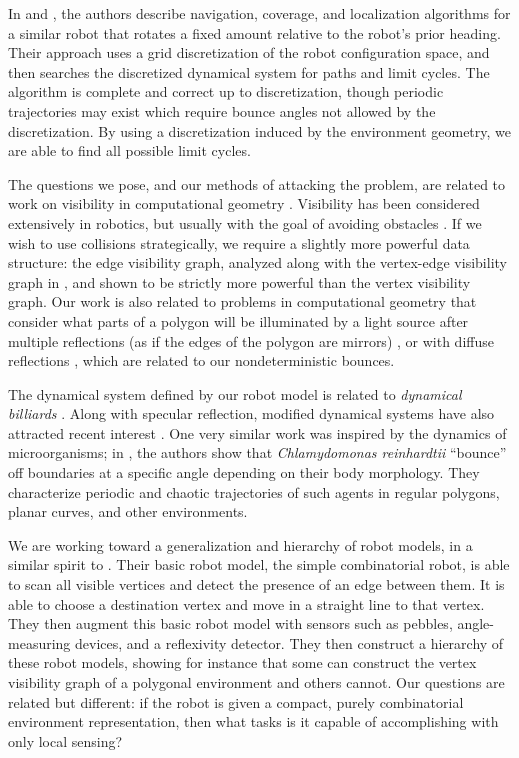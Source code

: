 \documentclass[]{styles/svproc}  %
\begin{document}
In \cite{alam2017minimalist} and \cite{alam2018space}, the authors describe
navigation, coverage, and localization algorithms for a similar robot that rotates a fixed amount 
relative to the robot's prior heading. 
Their approach uses a grid discretization of the robot configuration space, and 
then searches the discretized dynamical system for paths and limit cycles. The
algorithm is complete and correct up to discretization, though periodic
trajectories may exist which require bounce angles not allowed by the
discretization. By using a discretization induced by the environment geometry,
we are able to find all possible limit cycles.



The questions we pose, and our methods of attacking the problem, are related to
work on visibility in computational geometry \cite{ghosh2007visibility}. Visibility has been
considered extensively in robotics, but usually with the goal of avoiding obstacles 
\cite{lozano1979algorithm,SimLauNis00}. If we wish to use collisions strategically, 
we require a slightly more
powerful data structure: the edge visibility graph, analyzed along with the vertex-edge
visibility graph in \cite{rourke_viz}, and shown to be strictly more powerful
than the vertex visibility graph.
Our work is also related to problems in computational geometry that consider what
parts of a polygon will be illuminated by a light source after multiple
reflections (as if the edges of the polygon are mirrors) 
\cite{Aronov1996}, or with diffuse
reflections \cite{prasad1998visibility}, which are related to our nondeterministic bounces.

The dynamical system defined by our robot model is related to \emph{dynamical billiards}
\cite{billiards}. Along with specular reflection, modified dynamical systems have
also attracted recent interest \cite{DelMagno2014,pinball,billiards}. 
One very similar work was inspired by the dynamics of microorganisms; in \cite{microorganism2017}, 
the authors show that 
\textit{Chlamydomonas reinhardtii} ``bounce'' off boundaries at a specific
angle depending on their body morphology. They characterize periodic and
chaotic trajectories of such agents in regular polygons, planar curves, and other
environments.


We are working toward a generalization and hierarchy of robot models, in a
similar spirit to \cite{brunner2008simple}. Their basic robot model, the simple
combinatorial robot, is able to scan all visible vertices and detect the
presence of an edge between them. It is able to choose a destination vertex and
move in a straight line to that vertex. They then augment this basic robot model
with sensors such as pebbles, angle-measuring devices, and a reflexivity detector.
They then construct a hierarchy of these robot models, showing for instance that
some can construct the vertex visibility graph of a polygonal environment
and others cannot. Our questions are related but different: if the robot is
given a compact, purely combinatorial environment representation, then what tasks is 
it capable of accomplishing with only local sensing?
\end{document}
